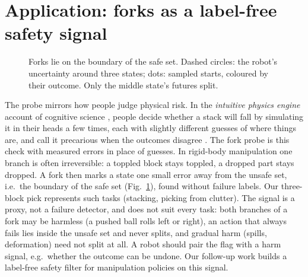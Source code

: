 \documentclass{article}
\begin{document}
\section{Application: forks as a label-free safety signal}\label{sec:safety}
\begin{figure}
\vspace{-12pt}
\centering

\vspace{-4pt}
\caption{Forks lie on the boundary of the safe set. Dashed circles: the robot's uncertainty around three
states; dots: sampled starts, coloured by their outcome. Only the middle state's futures split.}
\label{fig:boundary}
\vspace{-10pt}
\end{figure}
The probe mirrors how people judge physical risk. In the \emph{intuitive physics engine} account of
cognitive science \citep{battaglia2013simulation,smith2013sources,sanborn2013reconciling}, people decide
whether a stack will fall by simulating it in their heads a few times, each with slightly different
guesses of where things are, and call it precarious when the outcomes disagree \citep{zhou2023mental}. The fork probe is this check with measured
errors in place of guesses. In rigid-body manipulation one branch is often irreversible: a toppled block
stays toppled, a dropped part stays dropped. A fork then marks a state one small error away from the
unsafe set, i.e.\ the boundary of the safe set (Fig.~\ref{fig:boundary}), found without failure labels.
Our three-block pick represents such tasks (stacking, picking from clutter). The signal is a proxy, not a failure detector, and does not suit every task: both branches
of a fork may be harmless (a pushed ball rolls left or right), an action that always fails lies inside the
unsafe set and never splits, and gradual harm (spills, deformation) need not split at all. A robot should
pair the flag with a harm signal, e.g.\ whether the outcome can be undone. Our follow-up work builds a label-free
safety filter for manipulation policies on this signal.
\end{document}
